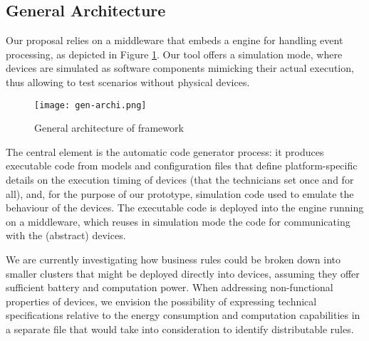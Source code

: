 \subsection{General Architecture}
\label{sec:CG-Architecture}

Our proposal relies on a middleware that embeds a \CEP engine for handling event processing, as depicted in Figure \ref{fig:Architecture}. Our tool offers a simulation mode, where devices are simulated as software components mimicking their actual execution, thus allowing to test \IOT scenarios without physical devices.

\begin{figure}%
	\centering  
	\texttt{[image: gen-archi.png]}%
	\caption{General architecture of \IOTDSL framework}%
	\label{fig:Architecture}%
\end{figure}

The central element is the automatic code generator process: it produces executable code from \IOTDSL models and configuration files that define platform-specific details on the execution timing of devices (that the technicians set once and for all), and, for the purpose of our prototype, simulation code used to emulate the behaviour of the devices. The executable code is deployed into the \CEP engine running on a middleware, which reuses in simulation mode the code for communicating with the (abstract) devices. 

We are currently investigating how business rules could be broken down into smaller clusters that might be deployed directly into devices, assuming they offer sufficient battery and computation power. When addressing non-functional properties of devices, we envision the possibility of expressing technical specifications relative to the energy consumption and computation capabilities in a separate file that \IOTDSL would take into consideration to identify distributable rules.

